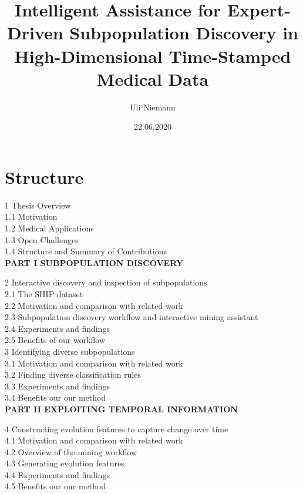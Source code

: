 \documentclass[
]{book}
\title{Intelligent Assistance for Expert-Driven Subpopulation Discovery in High-Dimensional Time-Stamped Medical Data}
\author{Uli Niemann}
\date{22.06.2020}
\begin{document}
\maketitle

{
\setcounter{tocdepth}{1}
\tableofcontents
}
\hypertarget{structure}{%
\section*{Structure}\label{structure}}

1 Thesis Overview\\
1.1 Motivation\\
1.2 Medical Applications\\
1.3 Open Challenges\\
1.4 Structure and Summary of Contributions\\

\textbf{PART I SUBPOPULATION DISCOVERY}

2 Interactive discovery and inspection of subpopulations\\
2.1 The SHIP dataset\\
2.2 Motivation and comparison with related work\\
2.3 Subpopulation discovery workflow and interactive mining assistant\\
2.4 Experiments and findings\\
2.5 Benefits of our workflow\\

3 Identifying diverse subpopulations\\
3.1 Motivation and comparison with related work\\
3.2 Finding diverse classification rules\\
3.3 Experiments and findings\\
3.4 Benefits our our method\\

\textbf{PART II EXPLOITING TEMPORAL INFORMATION}

4 Constructing evolution features to capture change over time\\
4.1 Motivation and comparison with related work\\
4.2 Overview of the mining workflow\\
4.3 Generating evolution features\\
4.4 Experiments and findings\\
4.5 Benefits our our method\\
\end{document}
